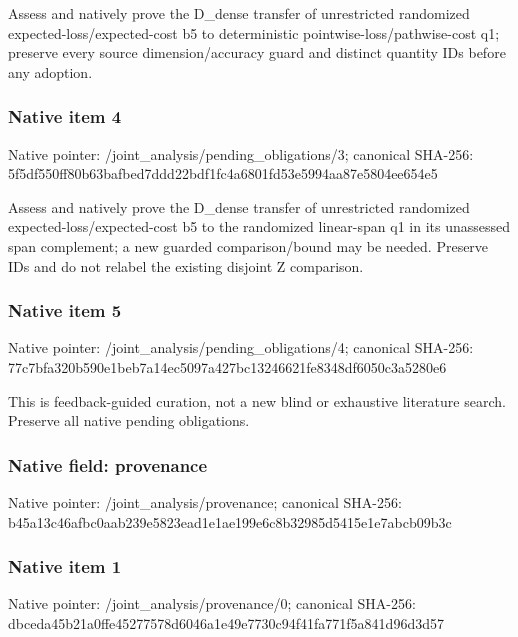 \documentclass[10pt,a4paper]{article}
\begin{document}
\begingroup\raggedright\sloppy Assess and natively prove the D\_\allowbreak{}dense transfer of unrestricted randomized expected-loss/\allowbreak{}expected-cost b5 to deterministic pointwise-loss/\allowbreak{}pathwise-cost q1;\allowbreak{} preserve every source dimension/\allowbreak{}accuracy guard and distinct quantity IDs before any adoption.\par\endgroup

\subsubsection{Native item 4}
Native pointer: /joint\_\allowbreak{}analysis/pending\_\allowbreak{}obligations/3; canonical SHA-256: 5f5df550ff80b63bafbed7ddd22bdf1fc4a6801fd53e5994aa87e5804ee654e5

\begingroup\raggedright\sloppy Assess and natively prove the D\_\allowbreak{}dense transfer of unrestricted randomized expected-loss/\allowbreak{}expected-cost b5 to the randomized linear-span q1 in its unassessed span complement;\allowbreak{} a new guarded comparison/\allowbreak{}bound may be needed. Preserve IDs and do not relabel the existing disjoint Z comparison.\par\endgroup

\subsubsection{Native item 5}
Native pointer: /joint\_\allowbreak{}analysis/pending\_\allowbreak{}obligations/4; canonical SHA-256: 77c7bfa320b590e1beb7a14ec5097a427bc13246621fe8348df6050c3a5280e6

\begingroup\raggedright\sloppy This is feedback-guided curation,\allowbreak{} not a new blind or exhaustive literature search. Preserve all native pending obligations.\par\endgroup

\subsubsection{Native field: provenance}
Native pointer: /joint\_\allowbreak{}analysis/provenance; canonical SHA-256: b45a13c46afbc0aab239e5823ead1e1ae199e6c8b32985d5415e1e7abcb09b3c

\subsubsection{Native item 1}
Native pointer: /joint\_\allowbreak{}analysis/provenance/0; canonical SHA-256: dbceda45b21a0ffe45277578d6046a1e49e7730c94f41fa771f5a841d96d3d57
\end{document}
